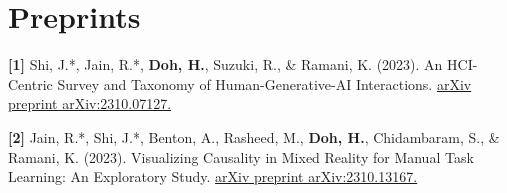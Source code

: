 \section{Preprints}
\begin{zitemize}

    \item[]\hspace{-0.3cm}\textbf{[1]} Shi, J.*, Jain, R.*, \textbf{Doh, H.}, Suzuki, R., \& Ramani, K. (2023). An HCI-Centric Survey and Taxonomy of Human-Generative-AI Interactions. \href{https://arxiv.org/abs/2310.07127}{arXiv preprint arXiv:2310.07127.}
    \item[]\hspace{-0.3cm}\textbf{[2]} Jain, R.*, Shi, J.*, Benton, A., Rasheed, M., \textbf{Doh, H.}, Chidambaram, S., \& Ramani, K. (2023). Visualizing Causality in Mixed Reality for Manual Task Learning: An Exploratory Study. \href{https://arxiv.org/abs/2310.13167}{arXiv preprint arXiv:2310.13167.}
\end{zitemize}

